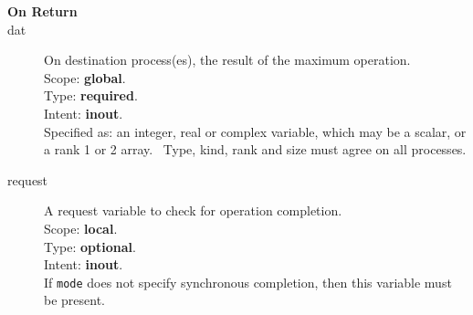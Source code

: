 \begin{description}
\item[\bf On Return]
\item[dat] On destination process(es), the result of the maximum operation.\\
Scope: {\bf global}.\\
Type: {\bf required}.\\
Intent: {\bf inout}.\\
Specified as: an integer, real or complex variable, which may be a
scalar, or a rank 1 or 2 array. \
Type, kind, rank and size must agree on all processes.
\item[request] A request variable to check for operation completion.\\
Scope: {\bf local}.\\
Type: {\bf optional}.\\
Intent: {\bf inout}.\\
If \verb|mode| does not specify synchronous completion, then this
variable must be present.
\end{description}



